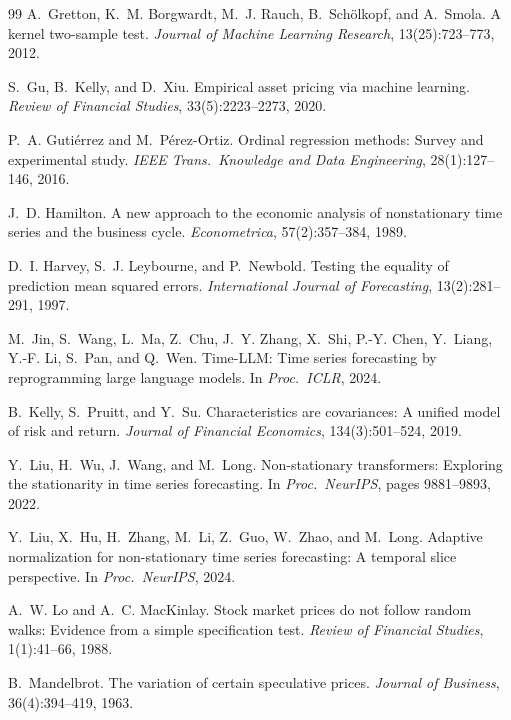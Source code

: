 \documentclass[11pt]{article}
\begin{document}
\begin{thebibliography}{99}
A.~Gretton, K.~M. Borgwardt, M.~J. Rauch, B.~Sch{\"o}lkopf, and
A.~Smola.
A kernel two-sample test.
\emph{Journal of Machine Learning Research}, 13(25):723--773, 2012.

S.~Gu, B.~Kelly, and D.~Xiu.
Empirical asset pricing via machine learning.
\emph{Review of Financial Studies}, 33(5):2223--2273, 2020.

P.~A. Guti{\'e}rrez and M.~P{\'e}rez-Ortiz.
Ordinal regression methods: Survey and experimental study.
\emph{IEEE Trans.\ Knowledge and Data Engineering}, 28(1):127--146, 2016.

J.~D. Hamilton.
A new approach to the economic analysis of nonstationary time series and the
business cycle.
\emph{Econometrica}, 57(2):357--384, 1989.

D.~I. Harvey, S.~J. Leybourne, and P.~Newbold.
Testing the equality of prediction mean squared errors.
\emph{International Journal of Forecasting}, 13(2):281--291, 1997.

M.~Jin, S.~Wang, L.~Ma, Z.~Chu, J.~Y. Zhang, X.~Shi, P.-Y. Chen,
Y.~Liang, Y.-F. Li, S.~Pan, and Q.~Wen.
Time-LLM: Time series forecasting by reprogramming large language models.
In \emph{Proc.\ ICLR}, 2024.

B.~Kelly, S.~Pruitt, and Y.~Su.
Characteristics are covariances: A unified model of risk and return.
\emph{Journal of Financial Economics}, 134(3):501--524, 2019.

Y.~Liu, H.~Wu, J.~Wang, and M.~Long.
Non-stationary transformers: Exploring the stationarity in time series
forecasting.
In \emph{Proc.\ NeurIPS}, pages 9881--9893, 2022.

Y.~Liu, X.~Hu, H.~Zhang, M.~Li, Z.~Guo, W.~Zhao, and M.~Long.
Adaptive normalization for non-stationary time series forecasting:
A temporal slice perspective.
In \emph{Proc.\ NeurIPS}, 2024.

A.~W. Lo and A.~C. MacKinlay.
Stock market prices do not follow random walks: Evidence from a simple
specification test.
\emph{Review of Financial Studies}, 1(1):41--66, 1988.

B.~Mandelbrot.
The variation of certain speculative prices.
\emph{Journal of Business}, 36(4):394--419, 1963.


\end{thebibliography}
\end{document}
